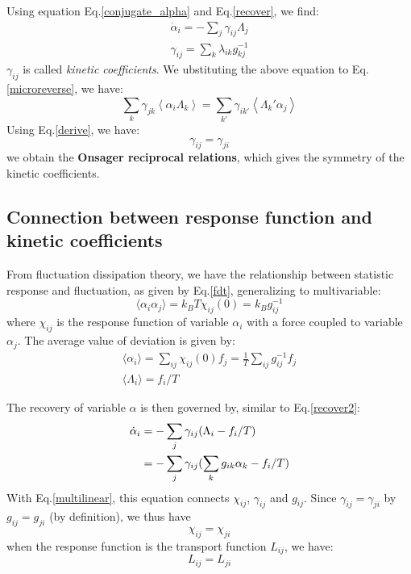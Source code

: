 \documentclass{article}
\begin{document}
Using equation Eq.\ref{conjugate_alpha} and Eq.\ref{recover}, we find:
\begin{gather}
    \dot{\alpha}_i = - \sum_{j} \gamma_{ij} \Lambda_j \label{recover2}\\
    \gamma_{ij} = \sum_k \lambda_{ik} g^{-1}_{kj}
\end{gather}
$\gamma_{ij}$ is called \emph{kinetic coefficients}. 
We ubstituting the above equation to Eq.\ref{microreverse}, we have:
\begin{equation}
    \sum_{k} \gamma_{jk} \left\langle \alpha_i \Lambda_k \right\rangle
    = \sum_{k'} \gamma_{ik'} \left\langle \Lambda_k' \alpha_j \right\rangle
\end{equation}
Using Eq.\ref{derive}, we have:
\begin{equation}
    \gamma_{ij} = \gamma_{ji}
\end{equation}
we obtain the \textbf{Onsager reciprocal relations}, which gives the symmetry of the 
kinetic coefficients.

\subsection{Connection between response function and kinetic coefficients}
From fluctuation dissipation theory, we have the relationship between statistic response 
and fluctuation, as given by Eq.\ref{fdt}, generalizing to multivariable:
\begin{equation}
    \langle \alpha_i \alpha_j \rangle = k_BT \chi_{ij}(0) = k_B g^{-1}_{ij}
\end{equation}
where $\chi_{ij}$ is the response function of variable $\alpha_i$ 
with a force coupled to variable $\alpha_j$. The average value of deviation is given by:
\begin{gather}
    \langle \alpha_i \rangle = \sum_{ij} \chi_{ij}(0) f_j = \frac{1}{T} \sum_{ij} g^{-1}_{ij} f_j \label{multilinear}\\
    \langle \Lambda_i \rangle = f_i / T
\end{gather}

The recovery of variable $\alpha$ is then governed by, similar to Eq.\ref{recover2}:
\begin{align}
    \dot{\alpha}_i &= - \sum_j \gamma_{ij} (\Lambda_i - f_i / T) \notag \\
    &= - \sum_j \gamma_{ij} (\sum_k g_{ik} \alpha_k - f_i / T) 
\end{align}
With Eq.\ref{multilinear}, this equation connects $\chi_{ij}$, $\gamma_{ij}$ and $g_{ij}$.
Since $\gamma_{ij} = \gamma_{ji}$ by $g_{ij} = g_{ji}$ (by definition), we thus have
\begin{equation}
    \chi_{ij} = \chi_{ji}
\end{equation} 
when the response function is the transport function $L_{ij}$, we have:
\begin{equation}
    L_{ij} = L_{ji}
\end{equation}
\end{document}
